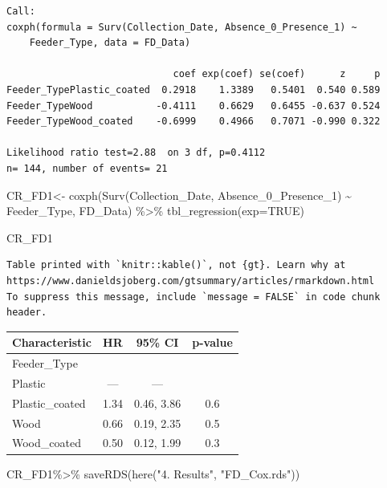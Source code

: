 \documentclass[
  letterpaper,
  DIV=11,
  numbers=noendperiod]{scrartcl}
\newenvironment{Shaded}{}{}
\newcommand{\AttributeTok}[1]{\textcolor[rgb]{0.84,0.23,0.29}{#1}}
\newcommand{\ConstantTok}[1]{\textcolor[rgb]{0.00,0.36,0.77}{#1}}
\newcommand{\FunctionTok}[1]{\textcolor[rgb]{0.44,0.26,0.76}{#1}}
\newcommand{\NormalTok}[1]{\textcolor[rgb]{0.14,0.16,0.18}{#1}}
\newcommand{\OtherTok}[1]{\textcolor[rgb]{0.44,0.26,0.76}{#1}}
\newcommand{\SpecialCharTok}[1]{\textcolor[rgb]{0.00,0.36,0.77}{#1}}
\newcommand{\StringTok}[1]{\textcolor[rgb]{0.01,0.18,0.38}{#1}}
\begin{document}
\begin{verbatim}
Call:
coxph(formula = Surv(Collection_Date, Absence_0_Presence_1) ~ 
    Feeder_Type, data = FD_Data)

                             coef exp(coef) se(coef)      z     p
Feeder_TypePlastic_coated  0.2918    1.3389   0.5401  0.540 0.589
Feeder_TypeWood           -0.4111    0.6629   0.6455 -0.637 0.524
Feeder_TypeWood_coated    -0.6999    0.4966   0.7071 -0.990 0.322

Likelihood ratio test=2.88  on 3 df, p=0.4112
n= 144, number of events= 21 
\end{verbatim}

\begin{Shaded}
\begin{Highlighting}[]
\NormalTok{CR\_FD1}\OtherTok{\textless{}{-}} \FunctionTok{coxph}\NormalTok{(}\FunctionTok{Surv}\NormalTok{(Collection\_Date, Absence\_0\_Presence\_1) }\SpecialCharTok{\textasciitilde{}}\NormalTok{ Feeder\_Type, FD\_Data) }\SpecialCharTok{\%\textgreater{}\%}
  \FunctionTok{tbl\_regression}\NormalTok{(}\AttributeTok{exp=}\ConstantTok{TRUE}\NormalTok{)}

\NormalTok{CR\_FD1}
\end{Highlighting}
\end{Shaded}

\begin{verbatim}
Table printed with `knitr::kable()`, not {gt}. Learn why at
https://www.danieldsjoberg.com/gtsummary/articles/rmarkdown.html
To suppress this message, include `message = FALSE` in code chunk header.
\end{verbatim}

\begin{longtable}[]{@{}lccc@{}}
\toprule()
\textbf{Characteristic} & \textbf{HR} & \textbf{95\% CI} &
\textbf{p-value} \\
\midrule()
\endhead
Feeder\_Type & & & \\
Plastic & --- & --- & \\
Plastic\_coated & 1.34 & 0.46, 3.86 & 0.6 \\
Wood & 0.66 & 0.19, 2.35 & 0.5 \\
Wood\_coated & 0.50 & 0.12, 1.99 & 0.3 \\
\bottomrule()
\end{longtable}

\begin{Shaded}
\begin{Highlighting}[]
\NormalTok{CR\_FD1}\SpecialCharTok{\%\textgreater{}\%}
  \FunctionTok{saveRDS}\NormalTok{(}\FunctionTok{here}\NormalTok{(}\StringTok{"4. Results"}\NormalTok{, }\StringTok{"FD\_Cox.rds"}\NormalTok{))}
\end{Highlighting}
\end{Shaded}
\end{document}
